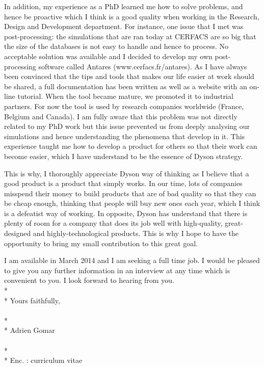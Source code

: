 \documentclass[10pt]{article}
\begin{document}
\noindent
In addition, my experience as a PhD learned me how to solve problems, and hence
be proactive which I think is a good quality when working in the 
Research, Design and Development department. 
For instance, one issue that I met was 
post-processing: the simulations that are ran today at CERFACS are so big
that the size of the databases is not easy to handle and hence to process. 
No acceptable solution was available and I decided to develop my own post-processing software 
called Antares (www.cerfacs.fr/antares). As I have always been convinced that
the tips and tools that makes our life easier at work should be shared, 
a full documentation has been written as well as a website with an on-line tutorial.
When the tool became mature, we promoted it to industrial partners. For now
the tool is used by research companies worldwide (France, Belgium and Canada).
I am fully aware that this problem was not directly related to my PhD work but
this issue prevented us from deeply analysing our simulations and hence understanding
the phenomena that develop in it. This experience taught me how
to develop a product for others so that their work can become easier, which I have
understand to be the essence of Dyson strategy.
\newline

\noindent
This is why, I thoroughly appreciate Dyson way of thinking as I believe that
a good product is a product that simply works. In our time, lots
of companies misspend their money to build products that are of 
bad quality so that they can be cheap enough, 
thinking that people will buy new ones each year, which I
think is a defeatist way of working. 
In opposite, Dyson has understand that there is plenty of room
for a company that does its job well with high-quality, great-designed and 
highly-technological products. This is why I hope to have
the opportunity to bring my small contribution to this great goal.
\newline

\noindent
I am available in March 2014 and I am seeking 
a full time job. I would be pleased to give you
any further information in an interview at any time which is convenient to you.
I look forward to hearing from you.
\\*
\\*
Yours faithfully, \\
\\*
\\*
Adrien Gomar \\
\\*
\\*
Enc. : curriculum vitae
\end{document}

